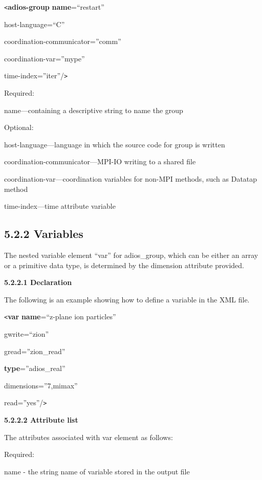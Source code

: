 \texttt{<}\textbf{adios-group} \textbf{name}=``restart'' 

\leftskip=72pt
host-language=``C''

coordination-communicator=''comm''

coordination-var=''mype''

time-index=''iter''/\texttt{>}

\leftskip=0pt
Required:

\leftskip=18pt
\parindent=3pt
name---containing a descriptive string to name the group

\leftskip=0pt
\parindent=0pt
Optional:

\leftskip=18pt
\parindent=3pt
host-language---language in which the source code for group is written

coordination-communicator---MPI-IO writing to a shared file

coordination-var---coordination variables for non-MPI methods, such as Datatap 
method

time-index---time attribute variable\label{HToc82067520}\label{HToc84890244}\label{HToc212016620}\label{HToc212016862}\label{HRef278369587}\label{HToc182553367}

\subsection*{{\large \textbf{5.2.2 Variables}}}

\leftskip=0pt
\parindent=0pt
The nested variable element ``var'' for adios\_group, which can be either an array 
or a primitive data type, is determined by the dimension attribute provided. 

\textbf{5.2.2.1 Declaration}

The following is an example showing how to define a variable in the XML file. 

\texttt{<}\textbf{var} \textbf{name}=``z-plane ion particles'' 

\leftskip=27pt
gwrite=``zion''

gread=''zion\_read''

\textbf{type}=''adios\_real''

dimensions=''7,mimax''

read=''yes''/\texttt{>}

\leftskip=0pt
\textbf{5.2.2.2 Attribute list}

The attributes associated with var element  as follows: 

Required:

\leftskip=18pt
\parindent=3pt
name - the string name of variable stored in the output file

